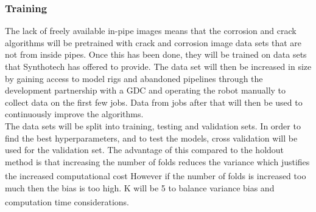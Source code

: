 \documentclass[11pt]{article}		%
\newcommand{\supercite}[1]{\textsuperscript{\cite{#1}}}		%
\begin{document}
			
        \subsubsection{Training}
        
        The lack of freely available in-pipe images means that %
       the corrosion and crack algorithms will be pretrained with crack and corrosion image data sets that are not from inside pipes. %
       Once this has been done, they will be trained on data sets that Synthotech has offered to provide. The data set will then be increased in size by gaining access to model rigs and abandoned pipelines through the development partnership with a GDC and operating the robot manually to collect data on the first few jobs. Data from jobs after that will then be used to continuously improve the algorithms. %
	    \\
        \hspace*{2ex}The data sets will be split into training, testing and validation sets. In order to find the best hyperparameters, and to test the models, cross validation will be used for the validation set. The advantage of this compared to the holdout method is that increasing the number of folds reduces the variance which justifies the increased computational cost\supercite{Cross_Validation} However if the number of folds is increased too much then the bias is too high. K will be 5 to balance variance bias and computation time considerations\supercite{Cross_Validation_Tradeoff}.
        
\end{document}
